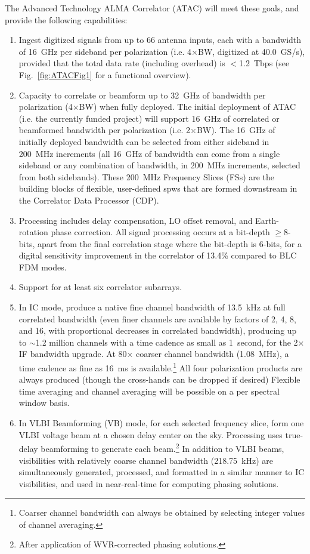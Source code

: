 The Advanced Technology ALMA Correlator (ATAC) will meet these goals, and provide the following capabilities:

\begin{enumerate}[itemsep=-0.5em]
\item	Ingest digitized signals from up to 66 antenna inputs, each with a bandwidth of 16~GHz per sideband per polarization (i.e. 4$\times$BW, digitized at 40.0~GS/s), provided that the total data rate (including overhead) is $<$1.2~Tbps (see Fig.~\ref{fig:ATACFig1} for a functional overview).
\item Capacity to correlate or beamform up to 32~GHz of bandwidth per polarization (4$\times$BW) when fully deployed.  The initial deployment of ATAC (i.e. the currently funded project) will support 16~GHz of correlated or beamformed bandwidth per polarization (i.e. 2$\times$BW).  The 16~GHz of initially deployed bandwidth can be selected from either sideband in 200~MHz increments (all 16~GHz of bandwidth can come from a single sideband or any combination of bandwidth, in 200~MHz increments, selected from both sidebands). These 200~MHz Frequency Slices (FSs) are the building blocks of flexible, user-defined spws that are formed downstream in the Correlator Data Processor (CDP).
\item	Processing includes delay compensation, LO offset removal, and Earth-rotation phase correction. All signal processing occurs at a bit-depth $\geq$8-bits, apart from the final correlation stage where the bit-depth is 6-bits, for a digital sensitivity improvement in the correlator of 13.4\% compared to BLC FDM modes. 
\item	Support for at least six correlator subarrays.
\item In IC mode, produce a native fine channel bandwidth of 13.5~kHz at full correlated bandwidth (even finer channels are available by factors of 2, 4, 8, and 16, with proportional decreases in correlated bandwidth), producing up to $\sim$1.2 million channels with a time cadence as small as 1~second, for the 2$\times$ IF bandwidth upgrade. At 80$\times$ coarser channel bandwidth (1.08~MHz), a time cadence as fine as 16~ms is available.\footnote{Coarser channel bandwidth can always be obtained by selecting integer values of channel averaging.} All four polarization products are always produced (though the cross-hands can be dropped if desired) Flexible time averaging and channel averaging will be possible on a per spectral window basis.
\item	In VLBI Beamforming (VB) mode, for each selected frequency slice, form one VLBI voltage beam at a chosen delay center on the sky.  Processing uses true-delay beamforming to generate each beam.\footnote{After application of WVR-corrected phasing solutions.}  In addition to VLBI beams, visibilities with relatively coarse channel bandwidth (218.75~kHz) are simultaneously generated, processed, and formatted in a similar manner to IC visibilities, and used in near-real-time for computing phasing solutions.

\end{enumerate}
